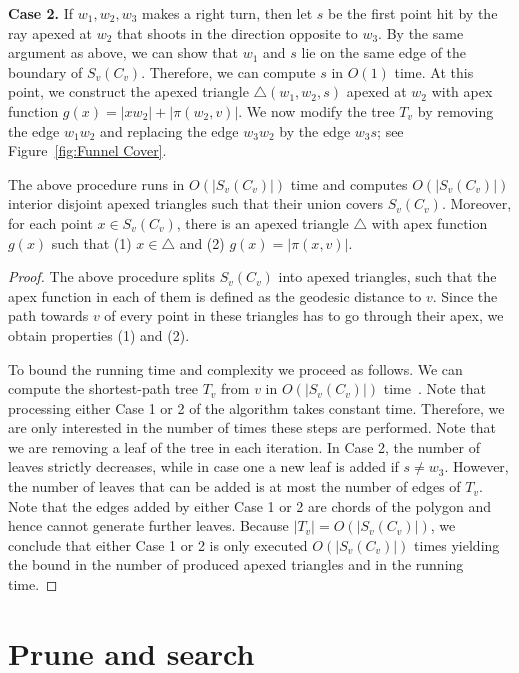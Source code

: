\documentclass[a4paper,UKenglish]{lipics}
\newcommand{\fn}[2]{\ensuremath{S_{\scriptscriptstyle #1}(#2)}}
\newcommand{\g}[2]{\ensuremath{|\pi(#1, #2)|}}
\begin{document}
\textbf{Case 2.} If $w_1, w_2, w_3$ makes a right turn, then let $s$ be the first point hit by the ray apexed at $w_2$ that shoots in the direction opposite to $w_3$. By the same argument as above, we can show that $w_1$ and $s$ lie on the same edge of the boundary of $\fn{v}{C_v}$. Therefore, we can compute $s$ in $O(1)$ time. At this point, we construct the apexed triangle $\triangle(w_1, w_2, s)$ apexed at $w_2$ with apex function $g(x) = |x w_2| + \g{w_2}{v}$.
We now modify the tree $T_v$ by removing the edge $w_1w_2$ and replacing the edge $w_3w_2$ by the edge $w_3s$; see Figure~\ref{fig:Funnel Cover}.

\begin{lemma}\label{lemma:Triangles inside funnels}
The above procedure runs in $O(|\fn{v}{C_v}|)$ time and computes $O(|\fn{v}{C_v}|)$ interior disjoint apexed triangles such that their union covers $\fn{v}{C_v}$. Moreover, for each point $x\in \fn{v}{C_v}$, there is an apexed triangle $\triangle$ with apex function $g(x)$ such that (1) $x\in \triangle$ and (2) $g(x) = \g{x}{v}$.
\end{lemma}
\begin{proof}
The above procedure splits $\fn{v}{C_v}$ into apexed triangles, such that the apex function in each of them is defined as the geodesic distance to $v$. Since the path towards $v$ of every point in these triangles has to go through their apex, we obtain properties (1) and (2).

To bound the running time and complexity we proceed as follows. 
We can compute the shortest-path tree $T_v$ from $v$ in $O(|\fn{v}{C_v}|)$ time~\cite{guibasShortestPathQueries}.
Note that processing either Case 1 or 2 of the algorithm takes constant time. Therefore, we are only interested in the number of times these steps are performed. Note that we are removing a leaf of the tree in each iteration. In Case 2, the number of leaves strictly decreases, while in case one a new leaf is added if $s\neq w_3$. However, the number of leaves that can be added is at most the number of edges of $T_v$. Note that the edges added by either Case 1 or 2 are chords of the polygon and hence cannot generate further leaves. Because $|T_v| = O(|\fn{v}{C_v}|)$, we conclude that either Case 1 or 2 is only executed $O(|\fn{v}{C_v}|)$ times yielding the bound in the number of produced apexed triangles and in the running time.
\end{proof}

\section{Prune and search}\label{section:Prune and search}
\end{document}
